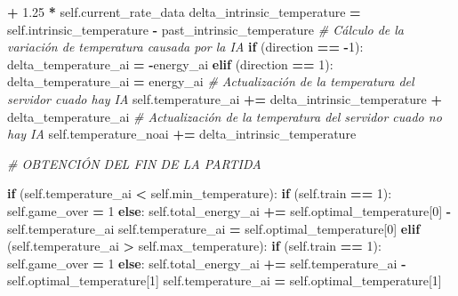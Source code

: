 \documentclass[
]{book}
\newenvironment{Shaded}{\begin{snugshade}}{\end{snugshade}}
\newcommand{\CommentTok}[1]{\textcolor[rgb]{0.56,0.35,0.01}{\textit{#1}}}
\newcommand{\ControlFlowTok}[1]{\textcolor[rgb]{0.13,0.29,0.53}{\textbf{#1}}}
\newcommand{\DecValTok}[1]{\textcolor[rgb]{0.00,0.00,0.81}{#1}}
\newcommand{\FloatTok}[1]{\textcolor[rgb]{0.00,0.00,0.81}{#1}}
\newcommand{\NormalTok}[1]{#1}
\newcommand{\OperatorTok}[1]{\textcolor[rgb]{0.81,0.36,0.00}{\textbf{#1}}}
\newcommand{\VariableTok}[1]{\textcolor[rgb]{0.00,0.00,0.00}{#1}}
\begin{document}
\begin{Shaded}
\begin{Highlighting}[]
                                     \OperatorTok{+} \FloatTok{1.25} \OperatorTok{*} \VariableTok{self}\NormalTok{.current\_rate\_data}
\NormalTok{        delta\_intrinsic\_temperature }\OperatorTok{=} \VariableTok{self}\NormalTok{.intrinsic\_temperature}
                                      \OperatorTok{{-}}\NormalTok{ past\_intrinsic\_temperature}
        \CommentTok{\# Cálculo de la variación de temperatura causada por la IA}
        \ControlFlowTok{if}\NormalTok{ (direction }\OperatorTok{==} \OperatorTok{{-}}\DecValTok{1}\NormalTok{):}
\NormalTok{            delta\_temperature\_ai }\OperatorTok{=} \OperatorTok{{-}}\NormalTok{energy\_ai}
        \ControlFlowTok{elif}\NormalTok{ (direction }\OperatorTok{==} \DecValTok{1}\NormalTok{):}
\NormalTok{            delta\_temperature\_ai }\OperatorTok{=}\NormalTok{ energy\_ai}
        \CommentTok{\# Actualización de la temperatura del servidor cuado hay IA}
        \VariableTok{self}\NormalTok{.temperature\_ai }\OperatorTok{+=}\NormalTok{ delta\_intrinsic\_temperature }\OperatorTok{+} 
\NormalTok{                               delta\_temperature\_ai}
        \CommentTok{\# Actualización de la temperatura del servidor cuado no hay IA}
        \VariableTok{self}\NormalTok{.temperature\_noai }\OperatorTok{+=}\NormalTok{ delta\_intrinsic\_temperature}
        
        \CommentTok{\# OBTENCIÓN DEL FIN DE LA PARTIDA}
        
        \ControlFlowTok{if}\NormalTok{ (}\VariableTok{self}\NormalTok{.temperature\_ai }\OperatorTok{\textless{}} \VariableTok{self}\NormalTok{.min\_temperature):}
            \ControlFlowTok{if}\NormalTok{ (}\VariableTok{self}\NormalTok{.train }\OperatorTok{==} \DecValTok{1}\NormalTok{):}
                \VariableTok{self}\NormalTok{.game\_over }\OperatorTok{=} \DecValTok{1}
            \ControlFlowTok{else}\NormalTok{:}
                \VariableTok{self}\NormalTok{.total\_energy\_ai }\OperatorTok{+=} \VariableTok{self}\NormalTok{.optimal\_temperature[}\DecValTok{0}\NormalTok{]}
                                        \OperatorTok{{-}} \VariableTok{self}\NormalTok{.temperature\_ai}
                \VariableTok{self}\NormalTok{.temperature\_ai }\OperatorTok{=} \VariableTok{self}\NormalTok{.optimal\_temperature[}\DecValTok{0}\NormalTok{]}
        \ControlFlowTok{elif}\NormalTok{ (}\VariableTok{self}\NormalTok{.temperature\_ai }\OperatorTok{\textgreater{}} \VariableTok{self}\NormalTok{.max\_temperature):}
            \ControlFlowTok{if}\NormalTok{ (}\VariableTok{self}\NormalTok{.train }\OperatorTok{==} \DecValTok{1}\NormalTok{):}
                \VariableTok{self}\NormalTok{.game\_over }\OperatorTok{=} \DecValTok{1}
            \ControlFlowTok{else}\NormalTok{:}
                \VariableTok{self}\NormalTok{.total\_energy\_ai }\OperatorTok{+=} \VariableTok{self}\NormalTok{.temperature\_ai}
                                        \OperatorTok{{-}} \VariableTok{self}\NormalTok{.optimal\_temperature[}\DecValTok{1}\NormalTok{]}
                \VariableTok{self}\NormalTok{.temperature\_ai }\OperatorTok{=} \VariableTok{self}\NormalTok{.optimal\_temperature[}\DecValTok{1}\NormalTok{]}
        

\end{Highlighting}
\end{Shaded}
\end{document}
